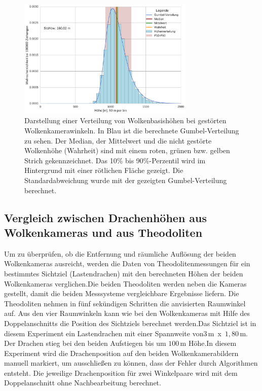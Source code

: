 \documentclass[a4paper,11pt,twoside,german]{article}
\newcommand{\absatz}{\smallbreak}
\begin{document}
\begin{figure}[h]
	\begin{center}
		\includegraphics[width=0.75\textwidth]{media/sens_prob_height.pdf}
		\caption[Wolkenhöhenverteilung von gestörten Wolkenkamerawinkeln]{Darstellung einer Verteilung von Wolkenbasishöhen bei gestörten Wolkenkamerawinkeln. In Blau ist die berechnete Gumbel-Verteilung zu sehen. Der Median, der Mittelwert und die nicht gestörte Wolkenhöhe (Wahrheit) sind mit einem roten, grünen bzw. gelben Strich gekennzeichnet. Das 10\% bis 90\%-Perzentil wird im Hintergrund mit einer rötlichen Fläche gezeigt. Die Standardabweichung wurde mit der gezeigten Gumbel-Verteilung berechnet.}
		\label{FIGSens}
	\end{center}
\end{figure}

\subsection{Vergleich zwischen Drachenhöhen aus Wolkenkameras und aus
Theodoliten} 
\label{SECDragon} 
Um zu überprüfen, ob die Entfernung und räumliche
Auflösung der beiden Wolkenkameras ausreicht, werden die Daten von
Theodolitenmessungen für ein bestimmtes Sichtziel (Lastendrachen) mit den
berechneten Höhen der beiden Wolkenkameras verglichen.\absatz Die beiden
Theodoliten werden neben die Kameras gestellt, damit die beiden Messsysteme
vergleichbare Ergebnisse liefern. Die Theodoliten nehmen in fünf sekündigen
Schritten die anvisierten Raumwinkel auf. Aus den vier Raumwinkeln kann wie bei
den Wolkenkameras mit Hilfe des Doppelanschnitts die Position des Sichtziels
berechnet werden.\absatz Das Sichtziel ist in diesem Experiment ein
Lastendrachen mit einer Spannweite von\linebreak[4]$3\,\mathrm{m}$~x~$1,80\,\mathrm{m}$. Der
Drachen stieg bei den beiden Aufstiegen bis um $100\,\mathrm{m}$ Höhe.\absatz In
diesem Experiment wird die Drachenposition auf den beiden Wolkenkamerabildern
manuell markiert, um ausschließen zu können, dass der Fehler durch Algorithmen
entsteht. Die jeweilige Drachenposition für zwei Winkelpaare wird mit dem
Doppelanschnitt ohne Nachbearbeitung berechnet.\absatz
\end{document}
